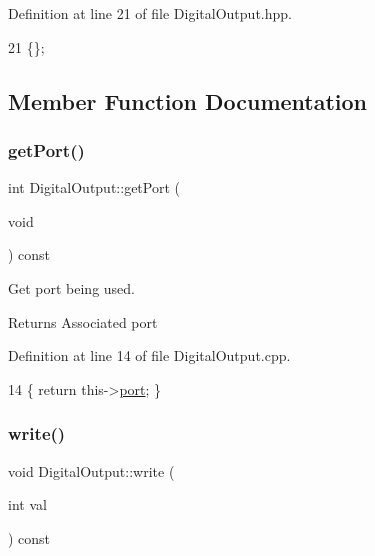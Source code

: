 Definition at line 21 of file Digital\+Output.\+hpp.


\begin{DoxyCode}
21 \{\};
\end{DoxyCode}


\subsection{Member Function Documentation}
\mbox{\label{class_digital_output_a36f4869bb51da9476cf22babc07d1e40}} 
\subsubsection{\texorpdfstring{get\+Port()}{getPort()}}
{\footnotesize\ttfamily int Digital\+Output\+::get\+Port (\begin{DoxyParamCaption}\item[{void}]{ }\end{DoxyParamCaption}) const}



Get port being used. 

\begin{DoxyReturn}{Returns}
Associated port 
\end{DoxyReturn}


Definition at line 14 of file Digital\+Output.\+cpp.


\begin{DoxyCode}
14 \{ \textcolor{keywordflow}{return} this->\hyperlink{class_digital_output_a01596de4b8252bd9033507e6feea1cb9}{port}; \}
\end{DoxyCode}
\mbox{\label{class_digital_output_a755a7a71484e600e45e70b61e41041b7}} 
\subsubsection{\texorpdfstring{write()}{write()}}
{\footnotesize\ttfamily void Digital\+Output\+::write (\begin{DoxyParamCaption}\item[{int}]{val }\end{DoxyParamCaption}) const}



